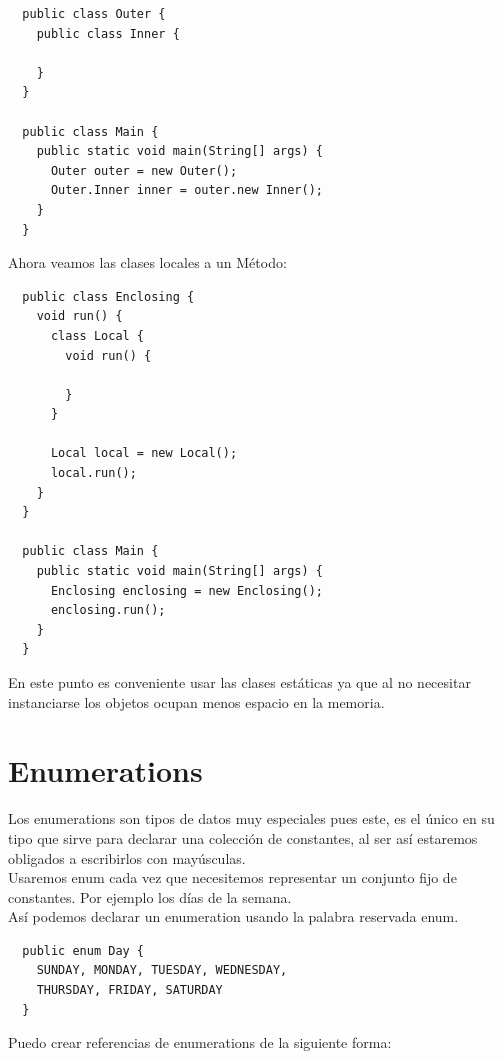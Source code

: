 \documentclass{article}
\begin{document}
\begin{verbatim}
  public class Outer {
    public class Inner {

    }
  }

  public class Main {
    public static void main(String[] args) {
      Outer outer = new Outer();
      Outer.Inner inner = outer.new Inner();
    }
  }
\end{verbatim}

Ahora veamos las clases locales a un Método:\\


\begin{verbatim}
  public class Enclosing {
    void run() {
      class Local {
        void run() {

        }
      }

      Local local = new Local();
      local.run();
    }
  }

  public class Main {
    public static void main(String[] args) {
      Enclosing enclosing = new Enclosing();
      enclosing.run();
    }
  }

\end{verbatim}

En este punto es conveniente usar las clases estáticas ya que al no necesitar
instanciarse los objetos ocupan menos espacio en la memoria.\\


\section{Enumerations}%
Los enumerations son tipos de datos muy especiales pues este, es el único en su
tipo que sirve para declarar una colección de constantes, al ser así estaremos
obligados a escribirlos con mayúsculas.\\

Usaremos enum cada vez que necesitemos representar un conjunto fijo de
constantes. Por ejemplo los días de la semana.\\

Así podemos declarar un enumeration usando la palabra reservada enum.\\

\begin{verbatim}
  public enum Day {
    SUNDAY, MONDAY, TUESDAY, WEDNESDAY,
    THURSDAY, FRIDAY, SATURDAY
  }
\end{verbatim}

Puedo crear referencias de enumerations de la siguiente forma:\\
\end{document}
